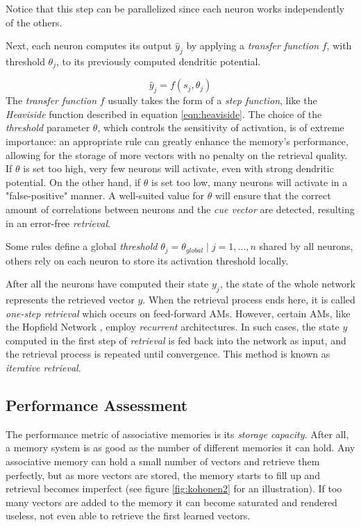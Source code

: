 \documentclass[runningheads]{llncs}
\begin{document}
Notice that this step can be parallelized since each neuron works independently of the others.

Next, each neuron computes its output $\hat{y}_j$ by applying a \textit{transfer function} $f$, with threshold $\theta_j$, to its previously computed dendritic potential.

\begin{equation}
    \hat{y}_{j}=f\left(s_{j},\theta_j\right)
\end{equation}
The \textit{transfer function} $f$ usually takes the form of a \textit{step function}, like the \textit{Heaviside} function described in equation \ref{eqn:heaviside}. The choice of the \textit{threshold} parameter $\theta$, which controls the sensitivity of activation, is of extreme importance: an appropriate rule can greatly enhance the memory's performance, allowing for the storage of more vectors with no penalty on the retrieval quality. If $\theta$ is set too high, very few neurons will activate, even with strong dendritic potential. On the other hand, if $\theta$ is set too low, many neurons will activate in a "false-positive" manner. A well-suited value for $\theta$ will ensure that the correct amount of correlations between neurons and the \textit{cue vector} are detected, resulting in an error-free \textit{retrieval}.

Some rules define a global \textit{threshold} $\theta_j = \theta_{global} \mid j=1, \ldots, n $ shared by all neurons, others rely on each neuron to store its activation threshold locally.

After all the neurons have computed their state $y_j$, the state of the whole network represents the retrieved vector $y$. When the retrieval process ends here, it is called \textit{one-step retrieval} which occurs on feed-forward AMs. However, certain AMs, like the Hopfield Network \cite{hopfield1982neural}, employ \textit{recurrent} architectures. In such cases, the state $y$ computed in the first step of \textit{retrieval} is fed back into the network as input, and the retrieval process is repeated until convergence. This method is known as \textit{iterative retrieval}.

\subsection{Performance Assessment}
\label{sec:assomem_perf}
The performance metric of associative memories is its \textit{storage capacity}. After all, a memory system is as good as the number of different memories it can hold. Any associative memory can hold a small number of vectors and retrieve them perfectly, but as more vectors are stored, the memory starts to fill up and retrieval becomes imperfect (see figure \ref{fig:kohonen2} for an illustration). If too many vectors are added to the memory it can become saturated and rendered useless, not even able to retrieve the first learned vectors.
\end{document}
